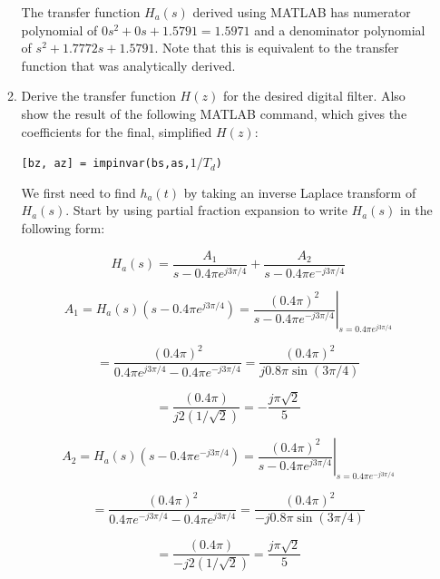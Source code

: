 \documentclass[fleqn]{article}
\begin{document}
\begin{enumerate}[nolistsep]
\begin{enumerate}[nolistsep]
				The transfer function $H_a(s)$ derived using MATLAB has numerator polynomial of $0s^2 + 0s + 1.5791 = 1.5971$ and a denominator polynomial of $s^2 + 1.7772s + 1.5791$. Note that this is equivalent to the transfer function that was analytically derived.
				
				\item Derive the transfer function $H(z)$ for the desired digital filter. Also show the result of the following MATLAB command, which gives the coefficients for the final, simplified $H(z)$:
				
				\texttt{[bz, az] = impinvar(bs,as,$1/T_d$)}
				
				We first need to find $h_a(t)$ by taking an inverse Laplace transform of $H_a(s)$. Start by using partial fraction expansion to write $H_a(s)$ in the following form:
				
				\begin{equation*}
					H_a(s) = \frac{A_1}{s - 0.4{\pi}e^{j3{\pi}/4}} +  \frac{A_2}{s - 0.4{\pi}e^{-j3{\pi}/4}}
				\end{equation*}
				
				\begin{equation*}
					A_1 = H_a(s)(s - 0.4{\pi}e^{j3{\pi}/4}) = \left.\frac{(0.4\pi)^2}{s - 0.4{\pi}e^{-j3{\pi}/4}}\right\vert_{s = 0.4{\pi}e^{j3{\pi}/4}}
				\end{equation*}
				
				\begin{equation*}
					= \frac{(0.4\pi)^2}{0.4{\pi}e^{j3{\pi}/4} - 0.4{\pi}e^{-j3{\pi}/4}} = \frac{(0.4\pi)^2}{j0.8{\pi}\sin(3\pi/4)}
				\end{equation*}
				
				\begin{equation*}
					 = \frac{(0.4\pi)}{j2(1/\sqrt{2})} = -\frac{j\pi\sqrt{2}}{5}
				\end{equation*}
				
				\begin{equation*}
					A_2 = H_a(s)(s - 0.4{\pi}e^{-j3{\pi}/4}) = \left.\frac{(0.4\pi)^2}{s - 0.4{\pi}e^{j3{\pi}/4}}\right\vert_{s = 0.4{\pi}e^{-j3{\pi}/4}}
				\end{equation*}
				
				\begin{equation*}
					= \frac{(0.4\pi)^2}{0.4{\pi}e^{-j3{\pi}/4} - 0.4{\pi}e^{j3{\pi}/4}} = \frac{(0.4\pi)^2}{-j0.8{\pi}\sin(3\pi/4)}
				\end{equation*}
				
				\begin{equation*}
					 = \frac{(0.4\pi)}{-j2(1/\sqrt{2})} = \frac{j\pi\sqrt{2}}{5}
				\end{equation*}
				

\end{enumerate}
\end{enumerate}
\end{document}
